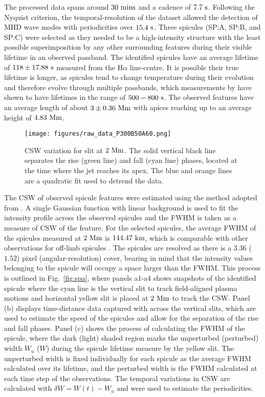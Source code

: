 %
The processed data spans around $30~\rm{mins}$ and a cadence of $7.7~\rm{s}$. Following the Nyquist criterion, the temporal-resolution of the dataset allowed the detection of MHD wave modes with periodicities over $15.4~\rm{s}$. Three spicules (SP:A, SP:B, and SP:C) were selected as they needed to be a high-intensity structure with the least possible superimposition by any other surrounding features during their visible lifetime in an observed passband. The identified spicules have an average lifetime of $118\pm 17.88~\rm{s}$ measured from the H$\alpha$ line-centre. It is possible their true lifetime is longer, as spicules tend to change temperature during their evolution and therefore evolve through multiple passbands, which measurements by \cite{Pereira2014ApJ} have shown to have lifetimes in the range of $500-800~\rm{s}$. The observed features have an average length of about $3\pm0.36~\rm{Mm}$ with apices reaching up to an average height of $4.83~\rm{Mm}$. \np
%
%
\begin{figure*}
\texttt{[image: figures/raw\_data\_P300B50A60.png]}
\caption{CSW variation for slit at $2~\rm{Mm}$. The solid vertical black line separates the rise (green line) and fall (cyan line) phases, located at the time where the jet reaches its apex. The blue and orange lines are a quadratic fit used to detrend the data.}  
\label{CSW_2m_height} 
\end{figure*}
The CSW of observed spicule features were estimated using the method adopted from \cite{Sharma2018ApJ85361S}. A single Gaussian function with linear background is used to fit the intensity profile across the observed spicules and the FWHM is taken as a measure of CSW of the feature. For the selected spicules, the average FWHM of the spicules measured at $2~\rm{Mm}$ is $144.47~\rm{km}$, which is comparable with other observations for off-limb spicules \citep{Sharma2018ApJ85361S}. The spicules are resolved as there is a $3.36$ ($1.52$) pixel (angular-resolution) cover, bearing in mind that the intensity values belonging to the spicule will occupy a space larger than the FWHM. This process is outlined in Fig.~\ref{fig:spa}, where panels a1-a4 shows snapshots of the identified spicule where the cyan line is the vertical slit to track field-aligned plasma motions and horizontal yellow slit is placed at $2~\rm{Mm}$ to track the CSW. Panel (b) displays time-distance data captured with across the vertical slits, which are used to estimate the speed of the spicules and allow for the separation of the rise and fall phases. Panel (c) shows the process of calculating the FWHM of the spicule, where the dark (light) shaded region marks the unperturbed (perturbed) width $W_u$ ($W$) during the spicule lifetime measure by the yellow slit. The unperturbed width is fixed individually for each spicule as the average FWHM calculated over its lifetime, and the perturbed width is the FWHM calculated at each time step of the observations. The temporal variations in CSW are calculated with $\delta W = W(t) - W_{u}$ and were used to estimate the periodicities. \np
